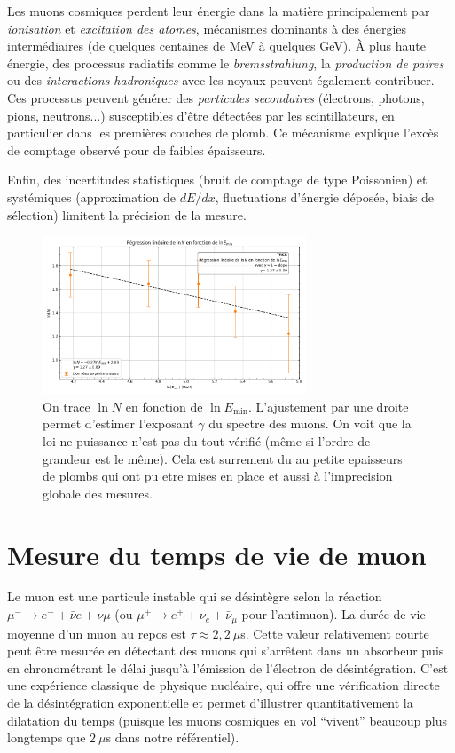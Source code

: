 \documentclass[a4paper,12pt,twoside]{article}
\begin{document}
Les muons cosmiques perdent leur énergie dans la matière principalement par \textit{ionisation} et \textit{excitation des atomes}, mécanismes dominants à des énergies intermédiaires (de quelques centaines de MeV à quelques GeV). À plus haute énergie, des processus radiatifs comme le \textit{bremsstrahlung}, la \textit{production de paires} ou des \textit{interactions hadroniques} avec les noyaux peuvent également contribuer. Ces processus peuvent générer des \textit{particules secondaires} (électrons, photons, pions, neutrons...) susceptibles d’être détectées par les scintillateurs, en particulier dans les premières couches de plomb. Ce mécanisme explique l’excès de comptage observé pour de faibles épaisseurs.

Enfin, des incertitudes statistiques (bruit de comptage de type Poissonien) et systémiques (approximation de $dE/dx$, fluctuations d’énergie déposée, biais de sélection) limitent la précision de la mesure.
\begin{figure}[!h]
  \centering
  \includegraphics[width=0.7\textwidth]{Images/plot_gamma.png}
  \caption{On trace $\ln N$ en fonction de $\ln E_{\min}$. L’ajustement par une droite permet d’estimer l’exposant $\gamma$ du spectre des muons.
  On voit que la loi ne puissance n'est pas du tout vérifié (même si l'ordre de grandeur est le même). Cela est surrement du au petite epaisseurs de plombs qui ont pu etre mises en place et aussi à l'imprecision globale des mesures.}
  \label{fig:energie_fit}
\end{figure}

\section{Mesure du temps de vie de muon}
Le muon est une particule instable qui se désintègre selon la réaction $\mu^- \to e^- + \bar{\nu}e + \nu\mu$ (ou $\mu^+ \to e^+ + \nu_e + \bar{\nu}_\mu$ pour l’antimuon). La durée de vie moyenne d’un muon au repos est $\tau \approx 2,2~\mu$s. Cette valeur relativement courte peut être mesurée en détectant des muons qui s’arrêtent dans un absorbeur puis en chronométrant le délai jusqu’à l’émission de l’électron de désintégration. C’est une expérience classique de physique nucléaire, qui offre une vérification directe de la désintégration exponentielle et permet d’illustrer quantitativement la dilatation du temps (puisque les muons cosmiques en vol “vivent” beaucoup plus longtemps que $2~\mu$s dans notre référentiel).
\end{document}
